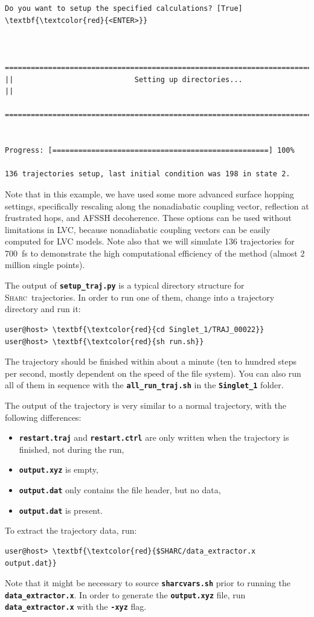 \documentclass[a4paper,11pt,DIV=15,openany]{scrbook}
\newcommand{\sharc}{\textsc{Sharc}}
\newcommand{\ttt}[1]{\textbf{\texttt{#1}}}
\begin{document}
\begin{oframed}
\begin{Verbatim}[commandchars=\\\{\}]
Do you want to setup the specified calculations? [True] \textbf{\textcolor{red}{<ENTER>}}


  ================================================================================
||                            Setting up directories...                           ||
  ================================================================================


Progress: [==================================================] 100%

136 trajectories setup, last initial condition was 198 in state 2.
\end{Verbatim}
\end{oframed}

\normalsize
Note that in this example, we have used some more advanced surface hopping settings, specifically rescaling along the nonadiabatic coupling vector, reflection at frustrated hops, and AFSSH decoherence.
These options can be used without limitations in LVC, because nonadiabatic coupling vectors can be easily computed for LVC models.
Note also that we will simulate 136 trajectories for 700~fs to demonstrate the high computational efficiency of the method (almost 2 million single points).

The output of \ttt{setup\_traj.py} is a typical directory structure for \sharc\ trajectories.
In order to run one of them, change into a trajectory directory and run it:
\begin{Verbatim}[commandchars=\\\{\}]
user@host> \textbf{\textcolor{red}{cd Singlet_1/TRAJ_00022}}
user@host> \textbf{\textcolor{red}{sh run.sh}}
\end{Verbatim}
The trajectory should be finished within about a minute (ten to hundred steps per second, mostly dependent on the speed of the file system).
You can also run all of them in sequence with the \ttt{all\_run\_traj.sh} in the \ttt{Singlet\_1} folder.

The output of the trajectory is very similar to  a normal trajectory, with the following differences:
\begin{itemize}
  \item \ttt{restart.traj} and \ttt{restart.ctrl} are only written when the trajectory is finished, not during the run,
  \item \ttt{output.xyz} is empty,
  \item \ttt{output.dat} only contains the file header, but no data,
  \item \ttt{output.dat} is present. 
\end{itemize}
To extract the trajectory data, run:
\begin{Verbatim}[commandchars=\\\{\}]
user@host> \textbf{\textcolor{red}{$SHARC/data_extractor.x output.dat}}
\end{Verbatim}
Note that it might be necessary to source \ttt{sharcvars.sh} prior to running the \ttt{data\_extractor.x}.
In order to generate the \ttt{output.xyz} file, run \ttt{data\_extractor.x} with the \ttt{-xyz} flag.
\end{document}
